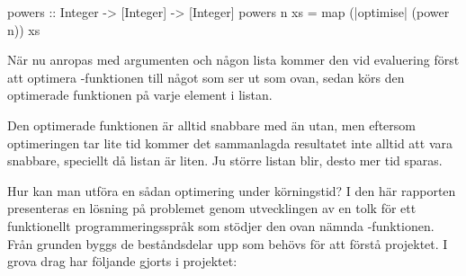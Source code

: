 \documentclass[Rapport]{subfiles}
\begin{document}
\begin{codeExDiff}
powers :: Integer -> [Integer] -> [Integer]
powers n xs = map (|optimise| (power n)) xs
\end{codeExDiff}

När nu  anropas med argumenten  och någon lista  kommer
den vid evaluering först att optimera -funktionen till något som 
ser ut som  ovan, sedan körs den optimerade funktionen på varje
element i listan.

Den optimerade funktionen är alltid snabbare med  än utan, men eftersom
optimeringen tar lite tid kommer det sammanlagda resultatet inte alltid att vara
snabbare, speciellt då listan  är liten. 
Ju större listan  blir, desto mer tid sparas.

Hur kan man utföra en sådan optimering under körningstid? I den här rapporten
presenteras en lösning på problemet genom utvecklingen av en tolk för ett
funktionellt programmeringsspråk som stödjer den ovan nämnda -funktionen. 
Från grunden byggs de beståndsdelar upp som behövs för att förstå projektet.
I grova drag har följande gjorts i projektet:

\begin{comment}
Koens kommentar:
"Bidrag" separat


skriv lite mer om rapportens uppbyggnad
1. i rätt ordning
2. läsaren? vad menas med detta?
            bra fråga såklart... låt mig tänka
            vet inte men hur överblicken såg ut förut så var det referenser
            först till sektion 3, sen 2 sen 4 osv, han kanske tänkte sig
            en bit med stöd till läsaren också
            har nu flyttat om dem så att de är i ordning iaf
            gott!
            det blir bra
            jag tuggar vidare :D
            fast inte separerat bidrag och överblickish
            then fire z'missiles! men känns onaturligt
            jag håller egentligen med. det blir duplicering. hur ska det skrivas
            på ett naturligt sätt? vet inte riktigt. men ganska likt så som vi hade det fast i ordning och lite mer utvecklat
            tror jag inte blir helt fel
vill vi separera bidrag? ja
\end{comment}
\end{document}
